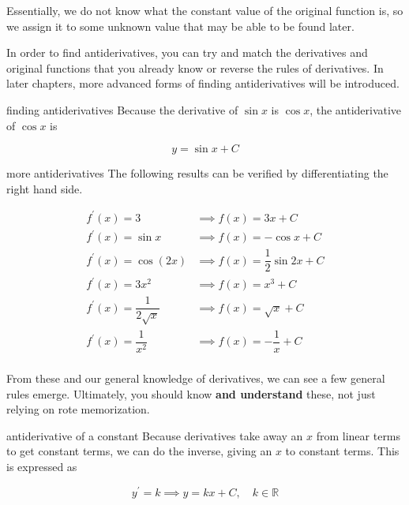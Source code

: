 Essentially, we do not know what the constant value of the original function is, so we assign it to some unknown value that may be able to be found later.

In order to find antiderivatives, you can try and match the derivatives and original functions that you already know or reverse the rules of derivatives. In later chapters, more advanced forms of finding antiderivatives will be introduced.

\begin{example}{finding antiderivatives}
    Because the derivative of \( \sin{x} \) is \( \cos{x} \), the antiderivative of \( \cos{x} \) is
    
    \[ y = \sin{x} + C \]
\end{example}

\begin{example}{more antiderivatives}
    The following results can be verified by differentiating the right hand side.

    \begin{align}
        f^\prime \left( x \right) = 3 &\implies f \left( x \right) = 3x + C \\
        f^\prime \left( x \right) = \sin{x} &\implies f \left( x \right) = -\cos{x} + C \\
        f^\prime \left( x \right) = \cos{\left( 2x \right)} &\implies f \left( x \right) = \dfrac{1}{2} \sin{2x} + C \\
        f^\prime \left( x \right) = 3x^2 &\implies f \left( x \right) = x^3 + C \\
        f^\prime \left( x \right) = \dfrac{1}{2\sqrt{x}} &\implies f \left( x \right) = \sqrt{x} + C \\
        f^\prime \left( x \right) = \dfrac{1}{x^2} &\implies f \left( x \right) = -\dfrac{1}{x} + C \\
    \end{align}
\end{example}

From these and our general knowledge of derivatives, we can see a few general rules emerge. Ultimately, you should know \textbf{and understand} these, not just relying on rote memorization.

\begin{definition}{antiderivative of a constant}
    Because derivatives take away an \( x \) from linear terms to get constant terms, we can do the inverse, giving an \( x \) to constant terms. This is expressed as

    \[ y^\prime = k \implies y = kx + C, \quad k \in \mathbb{R} \]
\end{definition}

